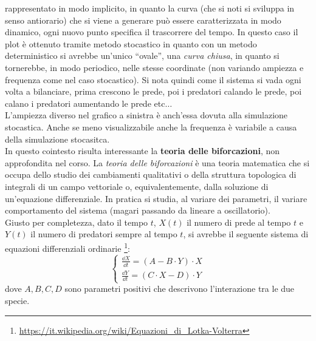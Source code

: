 \documentclass[a4paper,12pt, oneside]{book}
\begin{document}
rappresentato in modo implicito, in quanto la curva (che si noti si sviluppa in
senso antiorario) che si viene a generare può
essere caratterizzata in modo dinamico, ogni nuovo punto specifica il
trascorrere del tempo. In questo caso il
plot è ottenuto tramite metodo stocastico in quanto con un metodo deterministico
si avrebbe un'unico ``ovale'', una \textit{curva chiusa}, in quanto si
tornerebbe, in modo periodico, nelle 
stesse coordinate (non variando ampiezza e frequenza come nel caso
stocastico). Si nota quindi come il sistema si vada ogni volta a 
bilanciare, prima crescono le prede, poi i predatori calando le prede, poi
calano i predatori aumentando le prede etc$\ldots$\\
L'ampiezza diverso nel grafico a sinistra è anch'essa dovuta alla simulazione
stocastica. Anche se meno visualizzabile anche la frequenza è variabile a causa
della simulazione stocasitca.\\
In questo cointesto risulta interessante la \textbf{teoria delle biforcazioni},
non approfondita nel corso.
La \textit{teoria delle biforcazioni} è una teoria matematica che si occupa
dello studio dei cambiamenti qualitativi o della struttura topologica di
integrali di un campo vettoriale o, equivalentemente, dalla soluzione di
un'equazione differenziale. In pratica si studia, al variare dei parametri, il
variare comportamento del sistema (magari passando da lineare a oscillatorio).\\
Giusto per completezza, dato il tempo $t$, $X(t)$ il numero di prede al tempo
$t$ e $Y(t)$ il numero di predatori sempre al tempo $t$, si avrebbe il seguente
sistema di equazioni differenziali ordinarie
\footnote{\url{https://it.wikipedia.org/wiki/Equazioni_di_Lotka-Volterra}}: 
\[
  \begin{cases}
    \frac{\dd{X}}{\dd{t}}=(A-B\cdot Y)\cdot X\\
    \frac{\dd{Y}}{\dd{t}}=(C\cdot X-D)\cdot Y
  \end{cases}
\]
dove $A,B,C,D$ sono parametri positivi che descrivono l'interazione tra le due
specie. 
\end{document}
